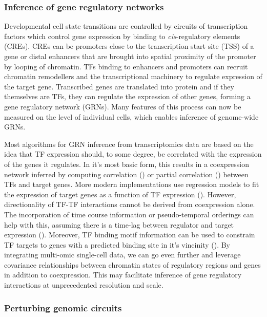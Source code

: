 \subsubsection{Inference of gene regulatory networks}

Developmental cell state transitions are controlled by circuits of transcription factors which control gene expression by binding to \textit{cis}-regulatory elements (CREs). CREs can be promoters close to the transcription start site (TSS) of a gene or distal enhancers that are brought into spatial proximity of the promoter by looping of chromatin. TFs binding to enhancers and promoters can recruit chromatin remodellers and the transcriptional machinery to regulate expression of the target gene. Transcribed genes are translated into protein and if they themselves are TFs, they can regulate the expression of other genes, forming a gene regulatory network (GRNs). Many features of this process can now be measured on the level of individual cells, which enables inference of genome-wide GRNs.

Most algorithms for GRN inference from transcriptomics data are based on the idea that TF expression should, to some degree, be correlated with the expression of the genes it regulates. In it's most basic form, this results in a coexpression network inferred by computing correlation (\cite{stuart_gene-coexpression_2003}) or partial correlation (\cite{kim_ppcor_2015}) between TFs and target genes. More modern implementations use regression models to fit the expression of target genes as a function of TF expression (\cite{aibar_scenic_2017}). However, directionality of TF-TF interactions cannot be derived from coexpression alone. The incorporation of time course information or pseudo-temporal orderings can help with this, assuming there is a time-lag between regulator and target expression (\cite{qiu_inferring_2020}). Moreover, TF binding motif information can be used to constrain TF targets to genes with a predicted binding site in it's vincinity (\cite{aibar_scenic_2017}). By integrating multi-omic single-cell data, we can go even further and leverage covariance relationships between chromatin states of regulatory regions and genes in addition to coexpression. This may facilitate inference of gene regulatory interactions at unprecedented resolution and scale.


\subsubsection{Perturbing genomic circuits}

